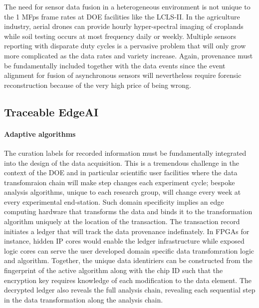 \documentclass{article}
\begin{document}

The need for sensor data fusion in a heterogeneous environment is not unique to the 1 MFps frame rates at DOE facilities like the LCLS-II.
In the agriculture industry, aerial drones can provide hourly hyper-spectral imaging of croplands while soil testing occurs at most frequency daily or weekly.
Multiple sensors reporting with disparate duty cycles is a pervasive problem that will only grow more complicated as the data rates and variety increase.
Again, provenance must be fundamentally included together with the data events since the event alignment for fusion of asynchronous sensors will nevertheless require forensic reconstruction because of the very high price of being wrong.





\subsection{Traceable EdgeAI}
\paragraph{Adaptive algorithms}
The curation labels for recorded information must be fundamentally integrated into the design of the data acquisition.  
This is a tremendous challenge in the context of the DOE and in particular scientific user facilities where the data transfomraion chain will make step changes each experiment cycle; bespoke analysis algorithms, unique to each research group, will change every week at every experimental end-station.
Such domain specificity implies an edge computing hardware that transforms the data and binds it to the transformation algorithm uniquely at the location of the transaction.
The transaction record initiates a ledger that will track the data provenance indefinately.
In FPGAs for instance, hidden IP cores would enable the ledger infrastructure while exposed logic cores can serve the user developed domain specific data transfomration logic and algorithm.
Together, the unique data identiriers can be constructed from the fingerprint of the active algorithm along with the chip ID such that the encryption key requires knowledge of each modification to the data element.
The decrypted ledger also reveals the full analysis chain, revealing each sequential step in the data transformation along the analysis chain.
\end{document}
